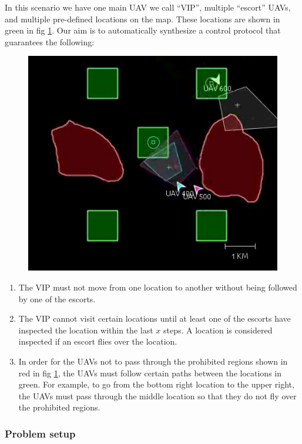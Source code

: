 \documentclass[]{article}
\begin{document}
In this scenario we have one main UAV we call ``VIP'', multiple
``escort'' UAVs, and multiple pre-defined locations on the map. These locations are shown in green in fig \ref{fig:vip}. Our aim is
to automatically synthesize a control protocol that guarantees the
following:
\begin{figure}[htp]
    \centering
\includegraphics[scale=.4]{figs/vip.png}
    \caption{}
    \label{fig:vip}
\end{figure}

\begin{enumerate}
\def\labelenumi{\arabic{enumi}.}
\itemsep1pt\parskip0pt
\item
  The VIP must not move from one location to another without being
  followed by one of the escorts.
\item
  The VIP cannot visit certain locations until at least one of the
  escorts have inspected the location within the last $x$ steps. A location is considered inspected if an escort flies over the location.
\item
    In order for the UAVs not to pass through the prohibited regions shown in red in fig \ref{fig:vip}, the UAVs must follow certain paths between the locations in green. For example, to go from the bottom right location to the upper right, the UAVs must pass through the middle location so that they do not fly over the prohibited regions.
\end{enumerate}

\subsubsection{Problem setup}\label{problem-setup}
\end{document}
